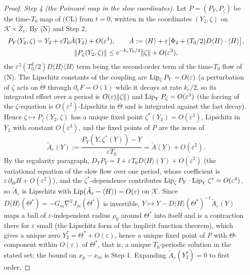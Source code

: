 \begin{proof}
\smallskip
\emph{Step 4 (the Poincaré map in the slow coordinates).} Let $P = (P_Y,P_\zeta)$ be the time-$T_0$ map of
\textup{(CL)} from $t = 0$, written in the coordinates $(Y_2,\zeta)$ on $\mathcal K\times Z_\varepsilon$. By
\textup{(N)} and Step 2,
\begin{gather*}
  P_Y(Y_2,\zeta) = Y_2 + \varepsilon T_0\tilde A(Y_2) + O(\varepsilon^3),\qquad
  \tilde A := \langle H\rangle + \varepsilon\bigl[\Phi_2 + (T_0/2)D\langle H\rangle\cdot\langle H\rangle\bigr],\\
  \lVert P_\zeta(Y_2,\zeta)\rVert \le e^{-k_eT_0/2}\lVert \zeta\rVert + O(\varepsilon^3),
\end{gather*}
the $\varepsilon^2(T_0^2/2)D\langle H\rangle\langle H\rangle$ term being the second-order term of the time-$T_0$ flow
of \textup{(N)}. The Lipschitz constants of the coupling are $\operatorname{Lip}_\zeta P_Y = O(\varepsilon)$ (a perturbation of
$\zeta$ acts on $\dot\Theta$ through $\partial_eF = O(1)$ while it decays at rate $k_e/2$, so its integrated effect
over a period is $O(\varepsilon)\lVert \zeta\rVert$) and $\operatorname{Lip}_YP_\zeta = O(\varepsilon^3)$ (the forcing of the
$\zeta$-equation is $O(\varepsilon^2)$-Lipschitz in $\Theta$ and is integrated against the fast decay). Hence
$\zeta\mapsto P_\zeta(Y_2,\zeta)$ has a unique fixed point $\zeta^*(Y_2) = O(\varepsilon^3)$, Lipschitz in $Y_2$ with
constant $O(\varepsilon^3)$, and the fixed points of $P$ are the zeros of
\[
  \tilde A_\varepsilon(Y) := \frac{P_Y(Y,\zeta^*(Y)) - Y}{\varepsilon T_0} = \tilde A(Y) + O(\varepsilon^2).
\]
By the regularity paragraph, $D_YP_Y = I + \varepsilon T_0D\langle H\rangle(Y) + O(\varepsilon^2)$ (the variational
equation of the slow flow over one period, whose coefficient is $\varepsilon\,\partial_\Theta H + O(\varepsilon^2)$),
and the $\zeta^*$-dependence contributes $\operatorname{Lip}_\zeta P_Y\cdot\operatorname{Lip}_Y\zeta^* = O(\varepsilon^4)$, so
$\tilde A_\varepsilon$ is Lipschitz with $\operatorname{Lip}(\tilde A_\varepsilon - \langle H\rangle) = O(\varepsilon)$ on
$\mathcal K$. Since $D\langle H\rangle(\Theta^*) = -G_m\nabla^2J_m(\Theta^*)$ is invertible,
$Y\mapsto Y - D\langle H\rangle(\Theta^*)^{-1}\tilde A_\varepsilon(Y)$ maps a ball of $\varepsilon$-independent radius
$\rho_0$ around $\Theta^*$ into itself and is a contraction there for $\varepsilon$ small (the Lipschitz form of the
implicit function theorem), which gives a unique zero $Y_2^* = \Theta^* + O(\varepsilon)$, hence a unique fixed point
of $P$ with $\Theta$-component within $O(\varepsilon)$ of $\Theta^*$, that is, a unique $T_0$-periodic solution in the
stated set; the bound on $x_p - x_m$ is Step 1. Expanding $\tilde A_\varepsilon(Y_2^*) = 0$ to first order,

\end{proof}
